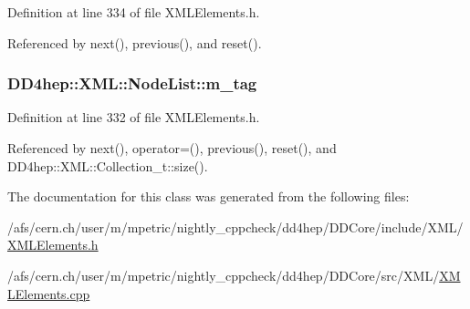 Definition at line 334 of file XMLElements.h.

Referenced by next(), previous(), and reset().\hypertarget{class_d_d4hep_1_1_x_m_l_1_1_node_list_ab375956d567e51de6da40c2ddbd3724d}{
\subsubsection[{m\_\-tag}]{ {\bf DD4hep::XML::NodeList::m\_\-tag}}}
\label{class_d_d4hep_1_1_x_m_l_1_1_node_list_ab375956d567e51de6da40c2ddbd3724d}


Definition at line 332 of file XMLElements.h.

Referenced by next(), operator=(), previous(), reset(), and DD4hep::XML::Collection\_\-t::size().

The documentation for this class was generated from the following files:\begin{DoxyCompactItemize}
\item 
/afs/cern.ch/user/m/mpetric/nightly\_\-cppcheck/dd4hep/DDCore/include/XML/\hyperlink{_x_m_l_elements_8h}{XMLElements.h}\item 
/afs/cern.ch/user/m/mpetric/nightly\_\-cppcheck/dd4hep/DDCore/src/XML/\hyperlink{_x_m_l_elements_8cpp}{XMLElements.cpp}\end{DoxyCompactItemize}
